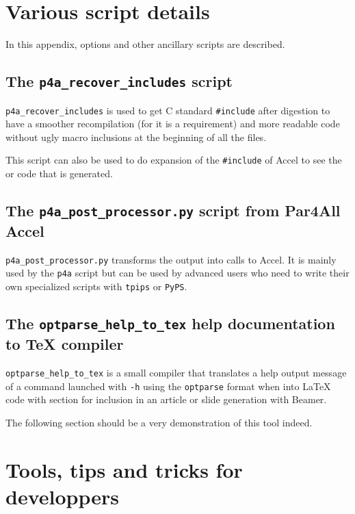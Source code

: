 \documentclass[a4paper]{article}
\begin{document}
\appendix

\section{Various script details}
\label{sec:vari-script-deta}

In this appendix, options and other ancillary scripts are described.

\subsection{The \protect\texttt{p4a\_recover\_includes} script}
\label{sec:p4a_recover_includes}

\verb|p4a_recover_includes| is used to get C standard \verb|#include|
after \Apips digestion to have a smoother recompilation (for \Acuda it is a
requirement) and more readable code without ugly macro inclusions at
the beginning of all the files.

This script can also be used to do expansion of the \verb|#include| of
\Apfa Accel to see the \Acuda or \Aopenmp code
that is generated.




\subsection{The \protect\texttt{p4a\_post\_processor.py} script from
  Par4All Accel}
\label{sec:p4a_p-script-from}

\verb|p4a_post_processor.py| transforms the \Apips
output into calls to \Apfa Accel. It is mainly used by the \texttt{p4a}
script but can be used by advanced users who need to write their own
specialized \Apips scripts with \texttt{tpips} or \texttt{PyPS}.




\subsection{The \protect\texttt{optparse\_help\_to\_tex} help
  documentation to \TeX{} compiler}
\label{sec:help-docum-tex}

\verb|optparse_help_to_tex| is a small compiler that translates a help
output message of a command launched with \texttt{-h} using the
\texttt{optparse} format when into La\TeX{} code with section for
inclusion in
an article or slide generation with Beamer.

The following section should be a very demonstration of this tool
indeed. \smiley



\section{Tools, tips and tricks for developpers}

\end{document}
